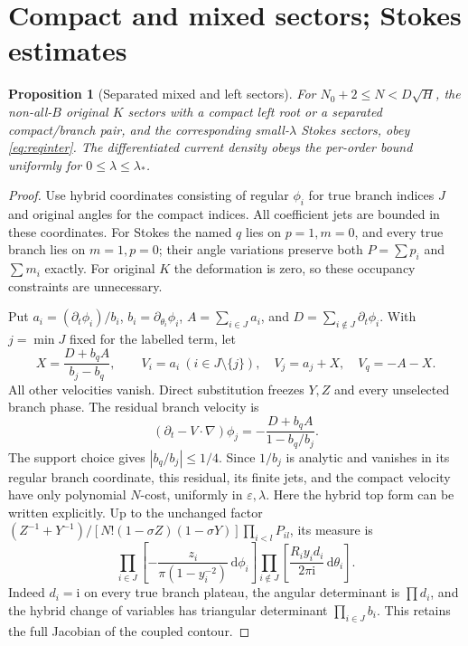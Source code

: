 \documentclass[11pt]{article}
\numberwithin{equation}{section}
\newtheorem{proposition}[theorem]{Proposition}
\theoremstyle{definition}
\newcommand{\dd}{\,\mathrm d}
\newcommand{\ii}{\mathrm i}
\newcommand{\eps}{\varepsilon}
\begin{document}
\section{Compact and mixed sectors; Stokes estimates}
\label{sec:sectors}
\begin{proposition}[Separated mixed and left sectors]\label{prop:mixed}
For \(N_0+2\le N<D\sqrt H\), the non-all-\(B\) original \(K\)
sectors with a compact left root or a separated compact/branch
pair, and the corresponding small-\(\lambda\) Stokes sectors,
obey \eqref{eq:reqinter}. The differentiated current density
obeys the per-order bound uniformly for \(0\le\lambda\le\lambda_*\).
\end{proposition}
\begin{proof}
Use hybrid coordinates consisting of regular \(\phi_i\) for true
branch indices \(J\) and original angles for the compact indices.
All coefficient jets are bounded in these coordinates.
For Stokes the named \(q\) lies on \(p=1,m=0\), and every true
branch lies on \(m=1,p=0\); their angle variations preserve both
\(P=\sum p_i\) and \(\sum m_i\) exactly.
For original \(K\) the deformation is zero, so these occupancy
constraints are unnecessary.

Put \(a_i=(\partial_t\phi_i)/b_i\),
\(b_i=\partial_{\theta_i}\phi_i\),
\(A=\sum_{i\in J}a_i\), and
\(D=\sum_{i\notin J}\partial_t\phi_i\).
With \(j=\min J\) fixed for the labelled term, let
\[
 X=\frac{D+b_qA}{b_j-b_q},\qquad
 V_i=a_i\ (i\in J\setminus\{j\}),\quad
 V_j=a_j+X,\quad V_q=-A-X .
 \]
All other velocities vanish. Direct substitution freezes \(Y,Z\)
and every unselected branch phase. The residual branch velocity is
\[
 (\partial_t-V\cdot\nabla)\phi_j
       =-\frac{D+b_qA}{1-b_q/b_j}.
\]
The support choice gives \(|b_q/b_j|\le1/4\).
Since \(1/b_j\) is analytic and vanishes in its regular branch
coordinate, this residual, its finite jets, and the compact
velocity have only polynomial \(N\)-cost, uniformly in \(\eps,\lambda\).
Here the hybrid top form can be written explicitly. Up to the
unchanged factor \((Z^{-1}+Y^{-1})/[N!(1-\sigma Z)(1-\sigma Y)]\prod_{i<l}P_{il}\),
its measure is
\[
 \prod_{i\in J}\left[-\frac{z_i}{\pi(1-y_i^{-2})}\dd\phi_i\right]
 \prod_{i\notin J}\left[\frac{R_i y_i d_i}{2\pi\ii}\dd\theta_i\right].
\]
Indeed \(d_i=\ii\) on every true branch plateau, the angular
determinant is \(\prod d_i\), and the hybrid change of variables
has triangular determinant \(\prod_{i\in J}b_i\).
This retains the full Jacobian of the coupled contour.


\end{proof}
\end{document}
